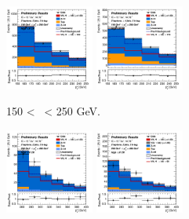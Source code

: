 \begin{figure}[h!]
\begin{subfigure}[b]{\textwidth}
        \includegraphics[width=0.32\textwidth]{Images/VH/Own_fit/postfit_VHbb/Region_distpTV_BMax250_BMin150_DCRHigh_J3_TTypebb_T2_L2_Y6051_GlobalFit_conditionnal_mu1.png}
        \includegraphics[width=0.32\textwidth]{Images/VH/Own_fit/postfit_VHbb/Region_distpTV_BMax250_BMin150_DCRHigh_J4_TTypebb_incJet1_T2_L2_Y6051_GlobalFit_conditionnal_mu1.png}
        \caption{150 < \ptv\ < 250 GeV.}
        \label{fig:plots_VHbb_2L_150_CRH}
    \end{subfigure}
    \begin{subfigure}[b]{\textwidth}
        \centering
        \includegraphics[width=0.32\textwidth]{Images/VH/Own_fit/postfit_VHbb/Region_distpTV_BMax400_BMin250_DCRHigh_J2_TTypebb_T2_L2_Y6051_GlobalFit_conditionnal_mu1.png}
        \includegraphics[width=0.32\textwidth]{Images/VH/Own_fit/postfit_VHbb/Region_distpTV_BMax400_BMin250_DCRHigh_J3_TTypebb_T2_L2_Y6051_GlobalFit_conditionnal_mu1.png}

\end{subfigure}
\end{figure}
